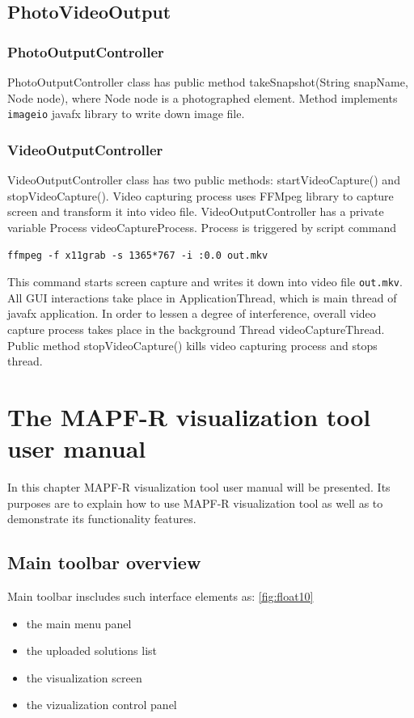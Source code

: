 \documentclass[thesis=B,english]{FITthesis}[2019/12/23]
\begin{document}
\section{PhotoVideoOutput}

\subsection{PhotoOutputController}

PhotoOutputController class has public method takeSnapshot(String snapName, Node node), where Node node is a photographed element. Method implements \verb|imageio| javafx library to write down image file. 

\subsection{VideoOutputController}

VideoOutputController class has two public methods: startVideoCapture() and stopVideoCapture(). Video capturing process uses FFMpeg library to capture screen and transform it into video file. VideoOutputController has a private variable Process videoCaptureProcess. Process is triggered by script command

\verb|ffmpeg -f x11grab -s 1365*767 -i :0.0 out.mkv|

This command starts screen capture and writes it down into video file \verb|out.mkv|.
All GUI interactions take place in ApplicationThread, which is main thread of javafx application. In order to lessen a degree of interference, overall video capture process takes place in the background Thread videoCaptureThread. Public method stopVideoCapture() kills video capturing process and stops thread.

\chapter{The MAPF-R visualization tool user manual}

In this chapter MAPF-R visualization tool user manual will be presented. Its purposes are to explain how to use MAPF-R visualization tool as well as to demonstrate its functionality features. 

\section{Main toolbar overview}

Main toolbar inscludes such interface elements as: \ref{fig:float10} 
\begin{itemize}
\item the main menu panel
\item the uploaded solutions list
\item the visualization screen 
\item the vizualization control panel
\end{itemize}
\end{document}
